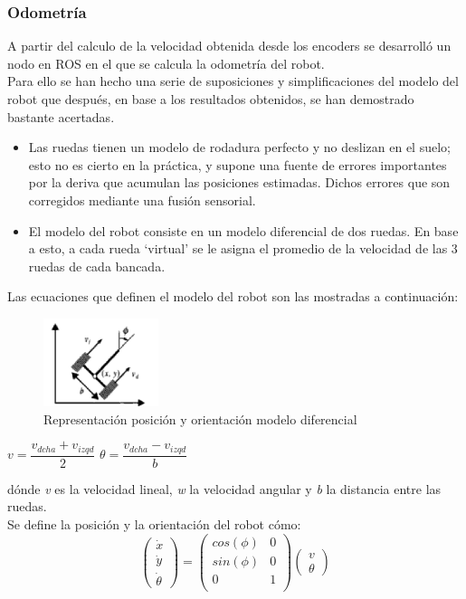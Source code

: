 \subsubsection{Odometría}
A partir del calculo de la velocidad obtenida desde los encoders se desarrolló un nodo en ROS en el que se calcula la odometría del robot.\\
Para ello se han hecho una serie de suposiciones y simplificaciones del modelo del robot que después, en base a los resultados obtenidos, se han demostrado bastante acertadas.
\begin{itemize}
    \item Las ruedas tienen un modelo de rodadura perfecto y no deslizan en el suelo; esto no es cierto en la práctica, y supone una fuente de errores importantes por la deriva que acumulan las posiciones estimadas. Dichos errores que son corregidos mediante una fusión sensorial.
    \item El modelo del robot consiste en un modelo diferencial de dos ruedas. En base a esto, a cada rueda `virtual' se le asigna el promedio de la velocidad de las 3 ruedas de cada bancada.
\end{itemize}
Las ecuaciones que definen el modelo del robot son las mostradas a continuación:
\begin{figure}[!ht]
    \centering
    \includegraphics[width=0.3\textwidth]{images/dif_model}
    \caption{Representación posición y orientación modelo diferencial}
\end{figure}
\begin{center}
    $v=\dfrac{v_{dcha}+v_{izqd}}{2}$ \hspace{2cm} $\theta=\dfrac{v_{dcha}-v_{izqd}}{b}$
\end{center}
dónde \textit{v} es la velocidad lineal, \textit{w} la velocidad angular y \textit{b} la distancia entre las ruedas.\\
Se define la posición y la orientación del robot cómo:
\begin{equation}
    \begin{pmatrix}
        \dot{x} \\
        \dot{y} \\
        \dot{\theta}
    \end{pmatrix}=
    \begin{pmatrix}
        cos(\phi) & 0 \\
        sin(\phi) & 0 \\
        0 & 1 \\
    \end{pmatrix}
    \begin{pmatrix}
        v \\
        \theta
    \end{pmatrix}
\end{equation}
